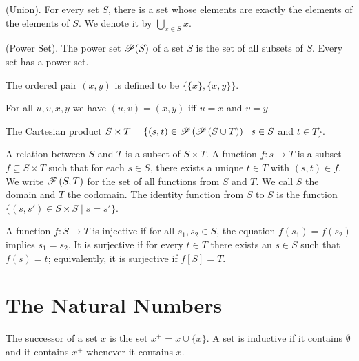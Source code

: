 \documentclass{report}
\begin{document}
\begin{axiom}
  {\normalfont (Union).} For every set $S$, there is a set whose elements are exactly the elements of the elements of $S$. We denote it by $\bigcup\limits_{x \in S} x$.
\end{axiom}

\begin{axiom}
  {\normalfont (Power Set).} The power set $\mathscr{P}(S)$ of a set $S$ is the set of all subsets of $S$. Every set has a power set.
\end{axiom}

\begin{definition}
  The ordered pair $\left( x,y \right)$ is defined to be $\{\{x\},\{x,y\}\}$.
\end{definition}

\begin{lemma}
  For all $u,v,x,y$ we have $(u,v) = (x,y)$ iff $u=x$ and $v=y$.
\end{lemma}

\begin{definition}
  The Cartesian product $S \times T = \{ (s,t) \in \mathscr{P} \left( \mathscr{P} \left( S \cup T \right) \right) \mid s \in S$ and $t \in T \}$.
\end{definition}

\begin{definition}
  A relation between $S$ and $T$ is a subset of $S \times T$. A function $f:s \rightarrow T$ is a subset $f \subseteq S \times T$ such that for each $s \in S$, there exists a unique $t \in T$ with $(s,t) \in f$. We write $\mathscr{F} \left( S,T \right)$ for the set of all functions from $S$ and $T$. We call $S$ the domain and $T$ the codomain. The identity function from $S$ to $S$ is the function $\{\left( s,s' \right) \in S \times S \mid s = s' \}$.
\end{definition}

\begin{definition}
  A function $f:S \rightarrow T$ is injective if for all $s_1,s_2 \in S$, the equation $f(s_1) = f(s_2)$ implies $s_1 = s_2$. It is surjective if for every $t \in T$ there exists an $s \in S$ such that $f(s) = t$; equivalently, it is surjective if $f[S] = T$.
\end{definition}

\newpage
\section{The Natural Numbers}
\begin{definition} 
  The successor of a set $x$ is the set $x^+ = x \cup \{x\}$. A set is inductive if it contains $\emptyset$ and it contains $x^+$ whenever it contains $x$.
\end{definition}
\end{document}
